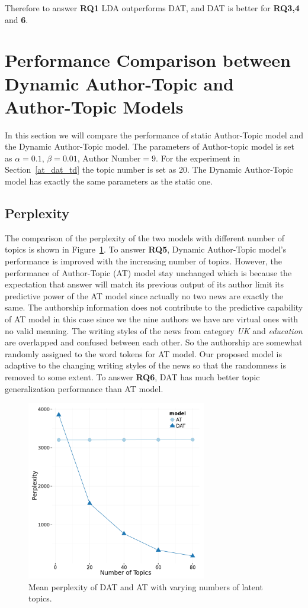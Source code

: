 Therefore to answer \textbf{RQ1} LDA outperforms DAT, and DAT is better for \textbf{RQ3,4} and \textbf{6}.


\section{Performance Comparison between Dynamic Author-Topic and Author-Topic Models}

In this section we will compare the performance of static Author-Topic model and the Dynamic Author-Topic model. The parameters of Author-topic model is set as $\alpha = 0.1$, $\beta = 0.01$, $\text{Author Number} = 9$. For the experiment in Section~\ref{at_dat_td} the topic number is set as 20. The Dynamic Author-Topic model has exactly the same parameters as the static one.

\subsection{Perplexity}
The comparison of the perplexity of the two models with different number of topics is shown in Figure~\ref{fig:at_dat_perplexity}. To answer \textbf{RQ5}, Dynamic Author-Topic model's performance is improved with the increasing number of topics. However, the performance of Author-Topic (AT) model stay unchanged which is because the expectation that answer will match its previous output of its author limit its predictive power of the AT model since actually no two news are exactly the same. The authorship information does not contribute to the predictive capability of AT model in this case since we the nine authors we have are virtual ones with no valid meaning. The writing styles of the news from category \textit{UK} and \textit{education} are overlapped and confused between each other. So the authorship are somewhat randomly assigned to the word tokens for AT model. Our proposed model is adaptive to the changing writing styles of the news so that the randomness is removed to some extent. To answer \textbf{RQ6}, DAT has much better topic generalization performance than AT model.

\begin{figure}[h]
\centering
\includegraphics[width=0.7\textwidth]{figures/at_dat_perplexity.png}
\caption{Mean perplexity of DAT and AT with varying numbers of latent topics.}
\label{fig:at_dat_perplexity}
\end{figure}

